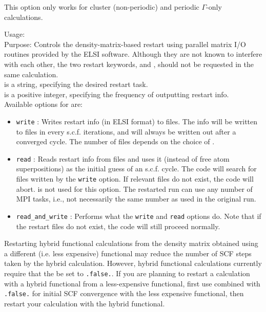 This option only works for cluster (non-periodic) and periodic
$\Gamma$-only calculations.

{
  \noindent
  Usage:    \\[1.0ex]
  Purpose: Controls the density-matrix-based restart using parallel matrix I/O
    routines provided by the ELSI software. Although they are not known to
    interfere with each other, the two restart keywords,  and
    , should not be requested in the same calculation. \\[1.0ex]
   is a string, specifying the desired restart task. \\[1.0ex]
   is a positive integer, specifying the frequency of outputting
    restart info. \\
}
Available options for  are:
\begin{itemize}
  \item \texttt{write} : Writes restart info (in ELSI format) to files. The info
    will be written to files in every  s.c.f. iterations, and will
    always be written out after a converged cycle. The number of files depends
    on the choice of .
  \item \texttt{read} : Reads restart info from files and uses it (instead of
    free atom superpositions) as the initial guess of an s.c.f. cycle. The code
    will search for files written by the \texttt{write} option. If relevant
    files do not exist, the code will abort.  is not used for this
    option. The restarted run can use any number of MPI tasks, i.e., not
    necessarily the same number as used in the original run.
  \item \texttt{read\_and\_write} : Performs what the \texttt{write} and
    \texttt{read} options do. Note that if the restart files do not exist, the
    code will still proceed normally.
\end{itemize}

Restarting hybrid functional calculations from the density matrix obtained using
a different (i.e. less expensive) functional may reduce the number of SCF
steps taken by the hybrid calculation. However, hybrid functional calculations
currently require that the  be set to
\texttt{.false.}. If you are planning to restart a calculation with a hybrid
functional from a less-expensive functional, first use 
combined with  \texttt{.false.} for initial
SCF convergence with the less expensive functional, then restart your
calculation with the hybrid functional.


